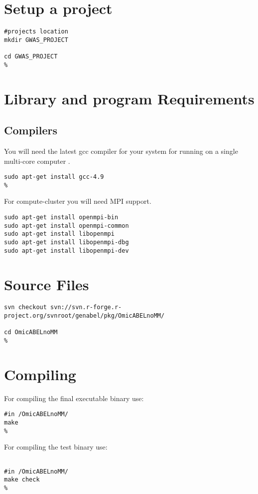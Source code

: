 \section{Setup a project}
\begin{lstlisting}[escapechar=\%]
#projects location
mkdir GWAS_PROJECT

cd GWAS_PROJECT
%
\end{lstlisting}

\section{Library and program Requirements}


\subsection{Compilers}

You will need the latest gcc compiler for your system for running \oanomm on a single multi-core computer .

\begin{lstlisting}[escapechar=\%]
sudo apt-get install gcc-4.9
%
\end{lstlisting}

For compute-cluster you will need \ac{MPI} support.

\begin{lstlisting}[escapechar=\%]
sudo apt-get install openmpi-bin
sudo apt-get install openmpi-common
sudo apt-get install libopenmpi
sudo apt-get install libopenmpi-dbg
sudo apt-get install libopenmpi-dev
\end{lstlisting}


\section{Source Files}

\begin{lstlisting}[basicstyle=\footnotesize\ttfamily,]
svn checkout svn://svn.r-forge.r-project.org/svnroot/genabel/pkg/OmicABELnoMM/

cd OmicABELnoMM
%
\end{lstlisting}

\section{Compiling}

For compiling the final executable binary use:
\begin{lstlisting}[escapechar=\%]
#in /OmicABELnoMM/
make
%
\end{lstlisting}

For compiling the test binary use:
\begin{lstlisting}[escapechar=\%]

#in /OmicABELnoMM/
make check
%
\end{lstlisting}

